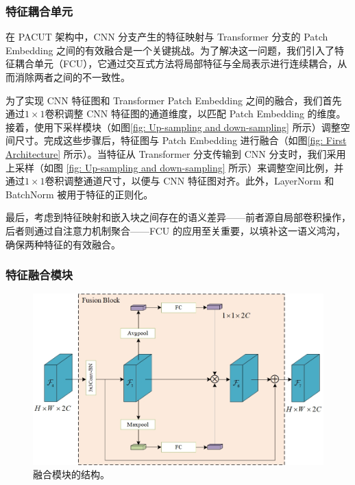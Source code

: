 \documentclass[a4paper]{ctexart}
\begin{document}
\subsubsection{特征耦合单元}

在 PACUT 架构中，CNN 分支产生的特征映射与 Transformer 分支的 Patch Embedding 之间的有效融合是一个关键挑战。为了解决这一问题，我们引入了特征耦合单元（FCU），它通过交互式方法将局部特征与全局表示进行连续耦合，从而消除两者之间的不一致性。



为了实现 CNN 特征图和 Transformer Patch Embedding 之间的融合，我们首先通过$1 \times 1$卷积调整 CNN 特征图的通道维度，以匹配 Patch Embedding 的维度。接着，使用下采样模块（如图\ref{fig: Up-sampling and down-sampling} 所示）调整空间尺寸。完成这些步骤后，特征图与 Patch Embedding 进行融合（如图\ref{fig: First Architecture} 所示）。当特征从 Transformer 分支传输到 CNN 分支时，我们采用上采样（如图 \ref{fig: Up-sampling and down-sampling} 所示）来调整空间比例，并通过$ 1 \times 1$卷积调整通道尺寸，以便与 CNN 特征图对齐。此外，LayerNorm 和 BatchNorm 被用于特征的正则化。

最后，考虑到特征映射和嵌入块之间存在的语义差异——前者源自局部卷积操作，后者则通过自注意力机制聚合——FCU 的应用至关重要，以填补这一语义鸿沟，确保两种特征的有效融合。
	
\subsubsection{特征融合模块}
	
\begin{figure}[htb]
	\centering 
	\includegraphics[width=0.7\columnwidth]{picture/LLIE/My Architecture/Fusion Block}
	\caption{
		\label{fig: Fusion Block} 
		融合模块的结构。
	}
\end{figure}
	
\end{document}
